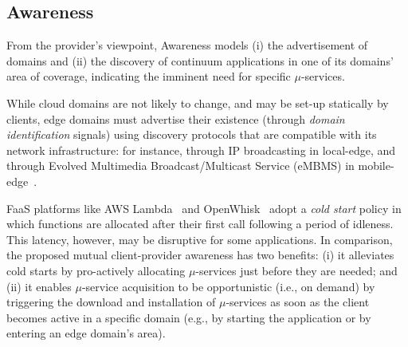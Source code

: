 




\subsection{Awareness}\label{sec:A3-E-awareness}

From the provider's viewpoint, Awareness models (i) the advertisement of domains and (ii) the discovery of continuum applications in one of its domains' area of coverage, indicating the imminent need for specific $\mu$-services. 


While cloud domains are not likely to change, and may be set-up statically by clients,
edge domains must advertise their existence (through \textit{domain identification} signals) using discovery protocols that are compatible with its network infrastructure: for instance, through IP broadcasting in local-edge, and through Evolved Multimedia Broadcast/Multicast Service (eMBMS) in mobile-edge~\cite{ETSI:MEC:ARCHITECTURE,lecompte2012evolved}. 

FaaS platforms like AWS Lambda~\cite{AWSLambda}
and OpenWhisk~\cite{OpenWhisk} adopt a \textit{cold start} policy in which functions are allocated after their first call following a period of idleness. This latency, however, may be disruptive for some applications. In comparison, the proposed mutual client-provider awareness 
has two benefits: (i) it alleviates cold starts by pro-actively allocating $\mu$-services just before they are needed; and (ii) it enables $\mu$-service acquisition to be opportunistic (i.e., on demand) by triggering the download and installation of $\mu$-services as soon as the client becomes active in a specific domain (e.g., by starting the application or by entering an edge domain's area).

